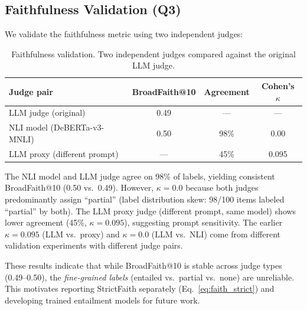 \subsection{Faithfulness Validation (Q3)}
\label{sec:exp:faith}

We validate the faithfulness metric using two independent judges:

\begin{table}[tb]
  \centering
  \caption{Faithfulness validation. Two independent judges compared against the original LLM judge.}
  \label{tab:faith_val}
  \small
  \begin{tabular}{lccc}
    \toprule
    Judge pair & BroadFaith@10 & Agreement & Cohen's $\kappa$ \\
    \midrule
    LLM judge (original) & 0.49 & --- & --- \\
    NLI model (DeBERTa-v3-MNLI) & 0.50 & 98\% & 0.00 \\
    LLM proxy (different prompt) & --- & 45\% & 0.095 \\
    \bottomrule
  \end{tabular}
\end{table}

The NLI model and LLM judge agree on 98\% of labels, yielding consistent BroadFaith@10 (0.50 vs.\ 0.49). However, $\kappa{=}0.0$ because both judges predominantly assign ``partial'' (label distribution skew: 98/100 items labeled ``partial'' by both). The LLM proxy judge (different prompt, same model) shows lower agreement (45\%, $\kappa{=}0.095$), suggesting prompt sensitivity. The earlier $\kappa{=}0.095$ (LLM vs.\ proxy) and $\kappa{=}0.0$ (LLM vs.\ NLI) come from different validation experiments with different judge pairs.

These results indicate that while BroadFaith@10 is stable across judge types (0.49--0.50), the \emph{fine-grained labels} (entailed vs.\ partial vs.\ none) are unreliable. This motivates reporting StrictFaith separately (Eq.~\ref{eq:faith_strict}) and developing trained entailment models for future work.

